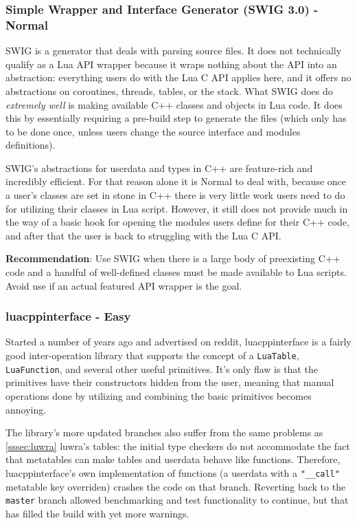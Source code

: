 \documentclass[conference,compsoc]{IEEEtran}
\begin{document}
\subsubsection{Simple Wrapper and Interface Generator (SWIG 3.0) - Normal}

SWIG\cite{swig} is a generator that deals with parsing source files. It does not technically qualify as a Lua API wrapper because it wraps nothing about the API into an abstraction: everything users do with the Lua C API applies here, and it offers no abstractions on coroutines, threads, tables, or the stack. What SWIG does do \emph{extremely well} is making available C++ classes and objects in Lua code. It does this by essentially requiring a pre-build step to generate the files (which only has to be done once, unless users change the source interface and modules definitions).

SWIG's abstractions for userdata and types in C++ are feature-rich and incredibly efficient. For that reason alone it is Normal to deal with, because once a user's classes are set in stone in C++ there is very little work users need to do for utilizing their classes in Lua script. However, it still does not provide much in the way of a basic hook for opening the modules users define for their C++ code, and after that the user is back to struggling with the Lua C API.

\textbf{Recommendation}: Use SWIG when there is a large body of preexisting C++ code and a handful of well-defined classes must be made available to Lua scripts. Avoid use if an actual featured API wrapper is the goal.

\subsubsection{luacppinterface - Easy}\label{sssec:luacppinterface}

Started a number of years ago and advertised on reddit, luacppinterface\cite{luacppinterface} is a fairly good inter-operation library that supports the concept of a \lstinline|LuaTable|, \lstinline|LuaFunction|, and several other useful primitives. It's only flaw is that the primitives have their constructors hidden from the user, meaning that manual operations done by utilizing and combining the basic primitives becomes annoying.

The library's more updated branches also suffer from the same problems as \cref{sssec:luwra} luwra's tables: the initial type checkers do not accommodate the fact that metatables can make tables and userdata behave like functions. Therefore, luacppinterface's own implementation of functions (a userdata with a \lstinline|"__call"| metatable key overriden) crashes the code on that branch. Reverting back to the \lstinline|master| branch allowed benchmarking and test functionality to continue, but that has filled the build with yet more warnings.
\end{document}
